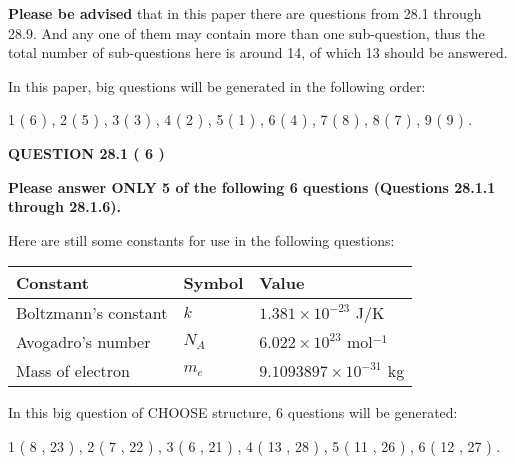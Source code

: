 \documentclass[12pt]{article}
\begin{document}
 
{\textbf{\large{Please be advised}}} that in this paper there are questions from
28.1 through
28.9.
And any one of them may contain more than one sub-question, thus the total number
of sub-questions here is around 14, of which
13 should be answered.
 
\vspace{0.3in}
 
 
   
   
   
\vspace{0.2in}
   
In this paper, big questions will be generated in the following order: 
   
   
             1 (           6 )
 ,
             2 (           5 )
 ,
             3 (           3 )
 ,
             4 (           2 )
 ,
             5 (           1 )
 ,
             6 (           4 )
 ,
             7 (           8 )
 ,
             8 (           7 )
 ,
             9 (           9 )
 .
  
\vspace{0.2in}
  
{\textbf{\Large{QUESTION
28.1 
 (           6 )
}}}
  
  
 
{\textbf{\Large{Please answer ONLY
5 of the following
6 questions (Questions
28.1.1 through
28.1.6). }}}
 
Here are still some constants for use in the following questions:
 
 
\noindent\begin{tabular}{|l|l|l|}
\hline
Constant & Symbol & Value \\
\hline
 
Boltzmann's constant &
$k$ &
 $ 1.381 \times 10^{-23} $
J/K \\
\hline
 
Avogadro's number &
$N_A$ &
 $ 6.022 \times 10^{23} $
mol$^{-1}$ \\
\hline
 
Mass of electron &
$m_e$ &
 $ 9.1093897 \times 10^{-31} $
kg \\
\hline
 
\end{tabular}
 
   
\vspace{0.2in}
   
 In this big question of CHOOSE structure,            6  questions will be generated: 
  
  
             1 (           8 ,          23 )
 ,
             2 (           7 ,          22 )
 ,
             3 (           6 ,          21 )
 ,
             4 (          13 ,          28 )
 ,
             5 (          11 ,          26 )
 ,
             6 (          12 ,          27 )
 .
  
\end{document}
